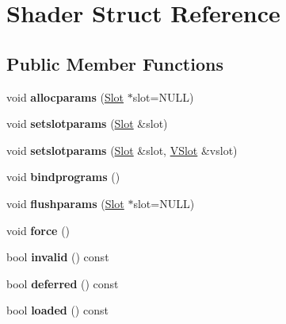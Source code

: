 \hypertarget{struct_shader}{}\section{Shader Struct Reference}
\label{struct_shader}
\subsection*{Public Member Functions}
\begin{DoxyCompactItemize}
\item 
\mbox{\label{struct_shader_a6b5692d41fe3d22b300d2bd0436d5932}} 
void {\bfseries allocparams} (\hyperlink{struct_slot}{Slot} $\ast$slot=N\+U\+LL)
\item 
\mbox{\label{struct_shader_adc7b90b55d5cff72b3e747748a86dc46}} 
void {\bfseries setslotparams} (\hyperlink{struct_slot}{Slot} \&slot)
\item 
\mbox{\label{struct_shader_a15e7b8f2307a84db121d7ff7ca40fff1}} 
void {\bfseries setslotparams} (\hyperlink{struct_slot}{Slot} \&slot, \hyperlink{struct_v_slot}{V\+Slot} \&vslot)
\item 
\mbox{\label{struct_shader_aa5358a5f674af7953655be764e301751}} 
void {\bfseries bindprograms} ()
\item 
\mbox{\label{struct_shader_af27fe1d3725ecba22d7b47c20f4d9037}} 
void {\bfseries flushparams} (\hyperlink{struct_slot}{Slot} $\ast$slot=N\+U\+LL)
\item 
\mbox{\label{struct_shader_a13e1acd44e0072b713f948ee038a940e}} 
void {\bfseries force} ()
\item 
\mbox{\label{struct_shader_a97308c31066772eebb8c1f1f8d5eb034}} 
bool {\bfseries invalid} () const
\item 
\mbox{\label{struct_shader_afd9a62f3a24bf86e1baf63fedb8f6fb1}} 
bool {\bfseries deferred} () const
\item 
\mbox{\label{struct_shader_a56965f0e3f82138c4b6c1f9dee9c4149}} 
bool {\bfseries loaded} () const
\item 

\end{DoxyCompactItemize}
